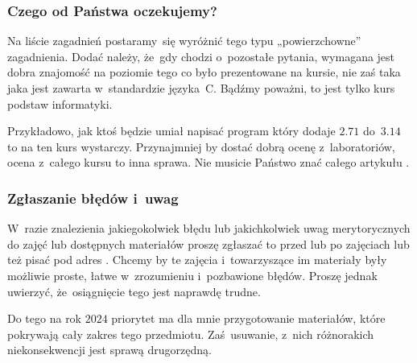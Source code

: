 \documentclass[10pt,t]{beamer}
\begin{document}
\begin{frame}
  \frametitle{Czego od Państwa oczekujemy?}


  Na liście zagadnień postaramy~się wyróżnić tego typu „powierzchowne”
  zagadnienia. Dodać należy, że~gdy chodzi o~pozostałe pytania, wymagana
  jest dobra znajomość na \alert{poziomie tego co było prezentowane na
    kursie}, nie zaś taka jaka jest zawarta w~standardzie języka~C.
  Bądźmy poważni, to jest tylko kurs podstaw informatyki.

  Przykładowo, jak ktoś będzie umiał napisać program który dodaje $2.71$
  do~$3.14$ to na \alert{ten} kurs wystarczy. Przynajmniej by dostać dobrą
  ocenę z~laboratoriów, ocena z~\alert{całego} kursu to inna sprawa.
  Nie musicie Państwo znać całego artykułu
  .



\end{frame}











\begin{frame}
  \frametitle{Zgłaszanie błędów i~uwag}


  W~razie znalezienia jakiegokolwiek błędu lub jakichkolwiek uwag
  merytorycznych do zajęć lub dostępnych materiałów proszę zgłaszać to
  przed lub po zajęciach lub też pisać pod adres \email. Chcemy by te
  zajęcia i~towarzyszące im materiały były możliwie proste, łatwe
  w~zrozumieniu i~pozbawione błędów. Proszę jednak uwierzyć, że~osiągnięcie
  tego jest naprawdę trudne.

  Do tego na rok $2024$ priorytet ma dla mnie przygotowanie
  materiałów, które pokrywają cały zakres tego przedmiotu. Zaś~usuwanie,
  z~nich różnorakich niekonsekwencji jest sprawą drugorzędną.

\end{frame}
\end{document}
